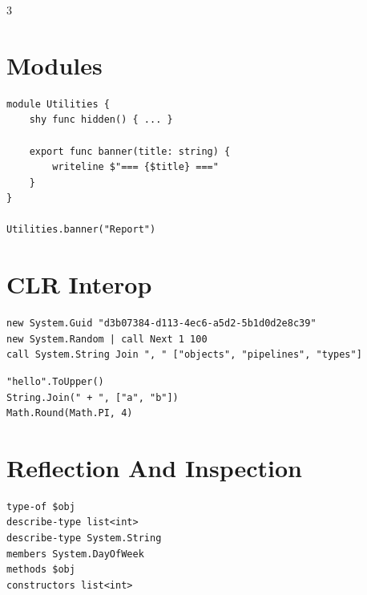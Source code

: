\begin{multicols*}{3}
\section{Modules}
\begin{lstlisting}
module Utilities {
    shy func hidden() { ... }

    export func banner(title: string) {
        writeline $"=== {$title} ==="
    }
}

Utilities.banner("Report")
\end{lstlisting}

\columnbreak

\section{CLR Interop}
\begin{lstlisting}
new System.Guid "d3b07384-d113-4ec6-a5d2-5b1d0d2e8c39"
new System.Random | call Next 1 100
call System.String Join ", " ["objects", "pipelines", "types"]
\end{lstlisting}

\begin{lstlisting}
"hello".ToUpper()
String.Join(" + ", ["a", "b"])
Math.Round(Math.PI, 4)
\end{lstlisting}



\section{Reflection And Inspection}
\begin{lstlisting}
type-of $obj
describe-type list<int>
describe-type System.String
members System.DayOfWeek
methods $obj
constructors list<int>
\end{lstlisting}


\end{multicols*}
